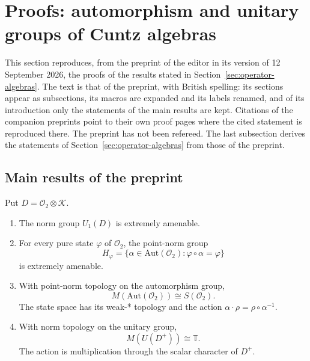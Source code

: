\section{Proofs: automorphism and unitary groups of Cuntz algebras}\label{sec:proofs-cuntz}

This section reproduces, from the preprint of the editor \cite{LupiniCuntz2026} in its version of 12 September 2026, the
proofs of the results stated in Section~\ref{sec:operator-algebras}. The text is that of the
preprint, with British spelling: its sections appear as subsections, its macros
are expanded and its labels renamed, and of its introduction only the
statements of the main results are kept. Citations of the companion preprints
point to their own proof pages where the cited statement is reproduced there.
The preprint has not been refereed. The last subsection derives the statements
of Section~\ref{sec:operator-algebras} from those of the preprint.

\subsection{Main results of the preprint}\label{sec:cu-main-results}

\begin{theorem}\label{thm:cu-main}
 Put $D=\mathcal{O}_2\otimes\mathcal{K}$.

\begin{enumerate}
\item The norm group $U_1(D)$ is extremely amenable.

\item For every pure state $\varphi$ of $\mathcal{O}_2$, the point-norm
group 
\begin{equation*}
H_\varphi=\{\alpha\in\mathrm{Aut}(\mathcal{O}_2):\varphi\circ\alpha=\varphi\}
\end{equation*}
is extremely amenable.

\item With point-norm topology on the automorphism group, 
\begin{equation*}
M(\mathrm{Aut}(\mathcal{O}_2))\cong S(\mathcal{O}_2).
\end{equation*}
The state space has its weak-* topology and the action $\alpha\cdot\rho=\rho \circ\alpha^{-1}$.

\item With norm topology on the unitary group, 
\begin{equation*}
M(U(D^+))\cong\mathbb{T}.
\end{equation*}
The action is multiplication through the scalar character of $D^+$.
\end{enumerate}
\end{theorem}

